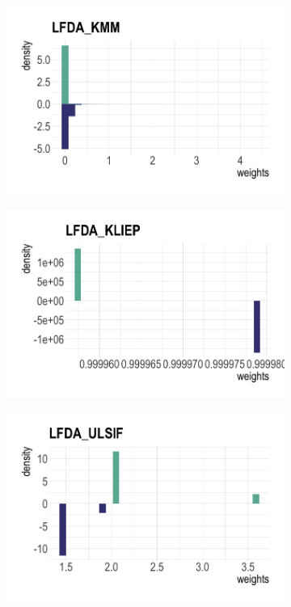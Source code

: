 \documentclass[a4paper,12pt]{article}
\begin{document}
\begin{figure}[H]
\begin{subfigure}{.32\textwidth}
  \label{fig:sfig2}
\end{subfigure} 
\begin{subfigure}{.32\textwidth}
  \centering
  \includegraphics[width=\linewidth]{toy7.png}
  \label{fig:sfig1}
\end{subfigure}
\begin{subfigure}{.32\textwidth}
  \centering
  \includegraphics[width=\linewidth]{toy8.png}
  \label{fig:sfig2}
\end{subfigure} 
\begin{subfigure}{.32\textwidth}
  \centering
  \includegraphics[width=\linewidth]{toy9.png}

\end{subfigure}
\end{figure}
\end{document}
